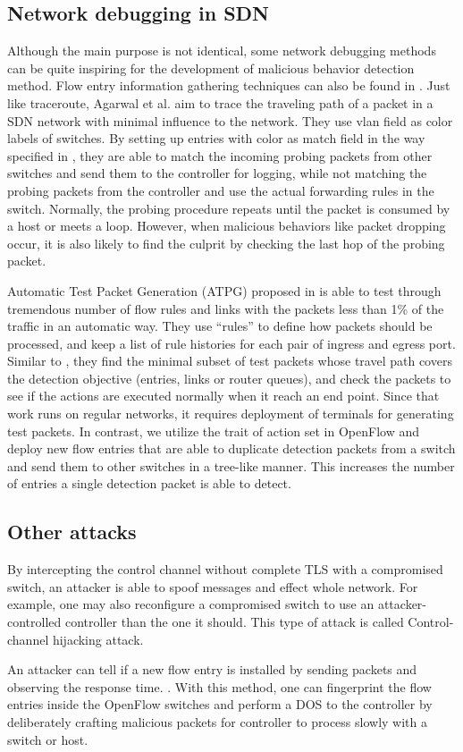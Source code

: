 \subsection{Network debugging in SDN}
Although the main purpose is not identical, some network debugging methods can be quite inspiring for the development of malicious behavior detection method. Flow entry information gathering techniques can also be found in \cite{ARDC14}. Just like traceroute, Agarwal et al. aim to trace the traveling path of a packet in a SDN network with minimal influence to the network. They use vlan field as color labels of switches. By setting up entries with color as match field in the way specified in \cite{ARDC14}, they are able to match the incoming probing packets from other switches and send them to the controller for logging, while not matching the probing packets from the controller and use the actual forwarding rules in the switch. Normally, the probing procedure repeats until the packet is consumed by a host or meets a loop. However, when malicious behaviors like packet dropping occur, it is also likely to find the culprit by checking the last hop of the probing packet.

Automatic Test Packet Generation (ATPG) proposed in \cite{ZKVM12} is able to test through tremendous number of flow rules and links with the packets less than 1\% of the traffic in an automatic way. They use ``rules'' to define how packets should be processed, and keep a list of rule histories for each pair of ingress and egress port. Similar to \cite{PJL16}, they find the minimal subset of test packets whose travel path covers the detection objective (entries, links or router queues), and check the packets to see if the actions are executed normally when it reach an end point. Since that work runs on regular networks, it requires deployment of terminals for generating test packets. In contrast, we utilize the trait of action set in OpenFlow and deploy new flow entries that are able to duplicate detection packets from a switch and send them to other switches in a tree-like manner. This increases the number of entries a single detection packet is able to detect. 

\subsection{Other attacks}
By intercepting the control channel without complete TLS with a compromised switch, an attacker is able to spoof messages and effect whole network. For example, one may also reconfigure a compromised switch to use an attacker-controlled controller than the one it should. This type of attack is called Control-channel hijacking attack.

An attacker can tell if a new flow entry is installed by sending packets and observing the response time. \cite{BCKK15}. With this method, one can fingerprint the flow entries inside the OpenFlow switches and perform a DOS to the controller by deliberately crafting malicious packets for controller to process slowly with a switch or host\cite{AAS14}.
